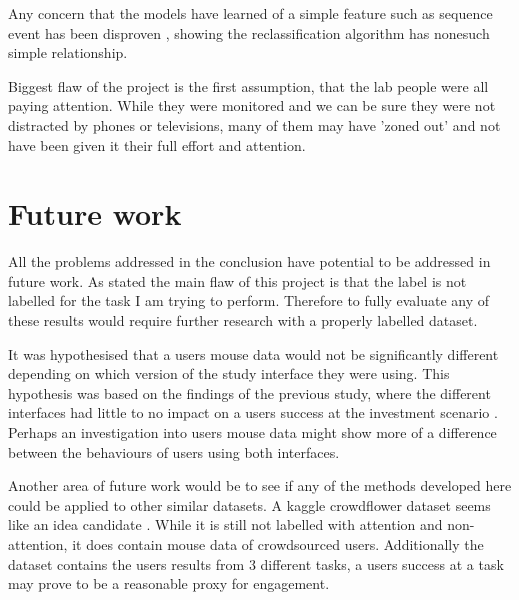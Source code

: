 \documentclass{article}
\begin{document}
Any concern that the models have learned of a simple feature such as sequence event has been disproven
, showing the reclassification algorithm has nonesuch simple relationship.

Biggest flaw of the project is the first assumption, that the lab people were all paying attention.
While they were monitored and we can be sure they were not distracted by phones or televisions, many of them may have 'zoned out' and not have been given it their full effort and attention.


\section{Future work}

All the problems addressed in the conclusion have potential to be addressed in future work.
As stated the main flaw of this project is that the label is not labelled for the task I am trying to perform.
Therefore to fully evaluate any of these results would require further research with a properly labelled dataset.


It was hypothesised that a users mouse data would not be significantly different depending on which version of the study interface they were using.
This hypothesis was based on the findings of the previous study, where the different interfaces had little to no impact on a users success at the investment scenario \cite{gruber2017thesis}.
Perhaps an investigation into users mouse data might show more of a difference between the behaviours of users using both interfaces.

Another area of future work would be to see if any of the methods developed here could be applied to other similar datasets.
A kaggle crowdflower dataset seems like an idea candidate \cite{kaggleWorkerActivity}.
While it is still not labelled with attention and non-attention, it does contain mouse data of crowdsourced users.
Additionally the dataset contains the users results from 3 different tasks, a users success at a task may prove to be a reasonable proxy for engagement. 

\printbibliography
\end{document}
